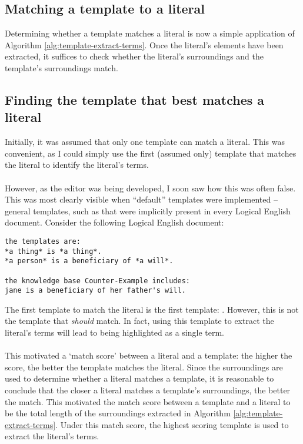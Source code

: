 \documentclass[../main.tex]{subfiles}
\begin{document}
\subsection{Matching a template to a literal}
Determining whether a template matches a literal is now a simple application of Algorithm \ref{alg:template-extract-terms}. Once the literal's elements have been extracted, it suffices to check whether the literal's surroundings and the template's surroundings match.

\subsection{Finding the template that best matches a literal}
Initially, it was assumed that only one template can match a literal. This was convenient, as I could simply use the first (assumed only) template that matches the literal to identify the literal's terms. 
\\
\\
However, as the editor was being developed, I soon saw how this was often false. This was most clearly visible when ``default'' templates were implemented -- general templates, such as  that were implicitly present in every Logical English document. Consider the following Logical English document:
\begin{lstlisting}[language={LE}]
the templates are:
*a thing* is *a thing*.
*a person* is a beneficiary of *a will*.

the knowledge base Counter-Example includes:
jane is a beneficiary of her father's will.
\end{lstlisting}
The first template to match the literal  is the first template: . However, this is not the template that \textit{should} match. In fact, using this template to extract the literal's terms will lead to  being highlighted as a single term.
\\ 
\\
This motivated a `match score' between a literal and a template: the higher the score, the better the template matches the literal. Since the surroundings are used to determine whether a literal matches a template, it is reasonable to conclude that the closer a literal matches a template's surroundings, the better the match. This motivated the match score between a template and a literal to be the total length of the surroundings extracted in Algorithm \ref{alg:template-extract-terms}. Under this match score, the highest scoring template is used to extract the literal's terms.
%
%
%
\end{document}
